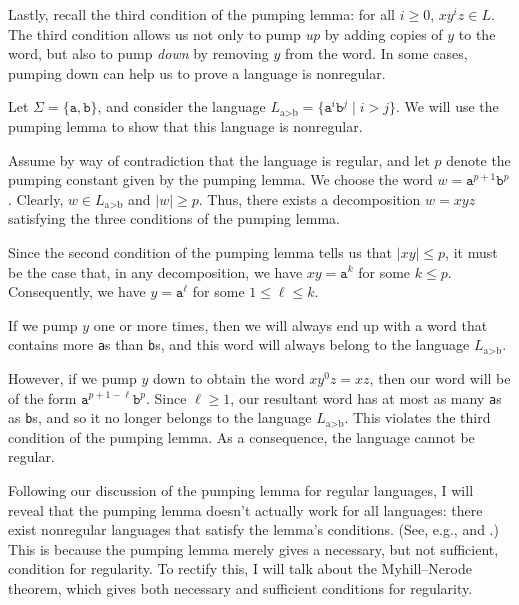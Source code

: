 Lastly, recall the third condition of the pumping lemma: for all $i \geq 0$, $xy^{i}z \in L$. The third condition allows us not only to pump \emph{up} by adding copies of $y$ to the word, but also to pump \emph{down} by removing $y$ from the word. In some cases, pumping down can help us to prove a language is nonregular.

\begin{example}
Let $\Sigma = \{\texttt{a}, \texttt{b}\}$, and consider the language $L_{\text{a}>\text{b}} = \{ \texttt{a}^{i}\texttt{b}^{j} \mid i > j\}$. We will use the pumping lemma to show that this language is nonregular.

Assume by way of contradiction that the language is regular, and let $p$ denote the pumping constant given by the pumping lemma. We choose the word $w = \texttt{a}^{p+1}\texttt{b}^{p}$. Clearly, $w \in L_{\text{a}>\text{b}}$ and $|w| \geq p$. Thus, there exists a decomposition $w = xyz$ satisfying the three conditions of the pumping lemma.

Since the second condition of the pumping lemma tells us that $|xy| \leq p$, it must be the case that, in any decomposition, we have $xy = \texttt{a}^{k}$ for some $k \leq p$. Consequently, we have $y = \texttt{a}^{\ell}$ for some $1 \leq \ell \leq k$.

If we pump $y$ one or more times, then we will always end up with a word that contains more \texttt{a}s than \texttt{b}s, and this word will always belong to the language $L_{\text{a}>\text{b}}$.

However, if we pump $y$ down to obtain the word $xy^{0}z = xz$, then our word will be of the form $\texttt{a}^{p+1-\ell}\texttt{b}^{p}$. Since $\ell \geq 1$, our resultant word has at most as many \texttt{a}s as \texttt{b}s, and so it no longer belongs to the language $L_{\text{a}>\text{b}}$. This violates the third condition of the pumping lemma. As a consequence, the language cannot be regular.
\end{example}


\begin{construction}
Following our discussion of the pumping lemma for regular languages, I will reveal that the pumping lemma doesn't actually work for all languages: there exist nonregular languages that satisfy the lemma's conditions. (See, e.g., \citet*{Ehrenfeucht1981PumpingLemmasRegularSets} and \citet{Johnsonbaugh1990ConversesPumpingLemmas}.) This is because the pumping lemma merely gives a necessary, but not sufficient, condition for regularity. To rectify this, I will talk about the Myhill--Nerode theorem, which gives both necessary and sufficient conditions for regularity.
\end{construction}